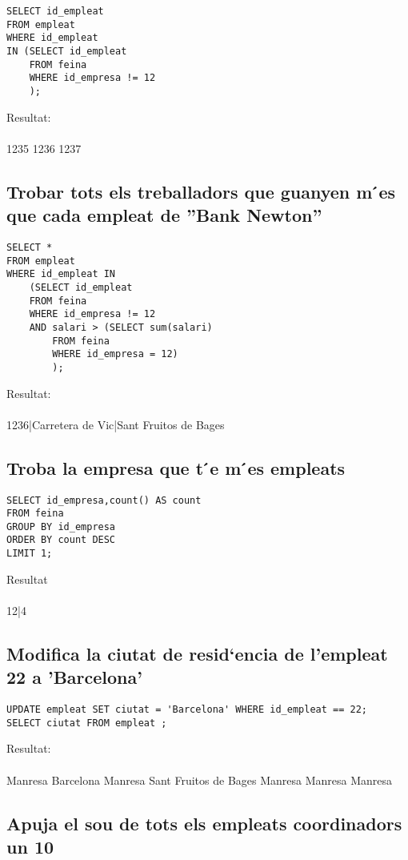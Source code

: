 \documentclass[11p]{article}
\begin{document}
\begin{lstlisting}
SELECT id_empleat 
FROM empleat 
WHERE id_empleat 
IN (SELECT id_empleat 
	FROM feina 
	WHERE id_empresa != 12
	);
\end{lstlisting}
Resultat:\\\\
1235
1236
1237

\subsection{Trobar tots els treballadors que guanyen m ́es que cada empleat de ”Bank Newton”}

\begin{lstlisting}
SELECT * 
FROM empleat 
WHERE id_empleat IN 
	(SELECT id_empleat 
	FROM feina 
	WHERE id_empresa != 12 
	AND salari > (SELECT sum(salari) 
		FROM feina 
		WHERE id_empresa = 12)
		); 
\end{lstlisting}

Resultat: \\\\
1236|Carretera de Vic|Sant Fruitos de Bages

\subsection{Troba la empresa que t ́e m ́es empleats}

\begin{lstlisting}
SELECT id_empresa,count() AS count 
FROM feina 
GROUP BY id_empresa 
ORDER BY count DESC
LIMIT 1;
\end{lstlisting}
Resultat\\\\
12|4

\subsection{Modifica la ciutat de resid`encia de l’empleat 22 a ’Barcelona’}
\begin{lstlisting}
UPDATE empleat SET ciutat = 'Barcelona' WHERE id_empleat == 22;
SELECT ciutat FROM empleat ;
\end{lstlisting}
Resultat:\\\\

Manresa
Barcelona
Manresa
Sant Fruitos de Bages
Manresa
Manresa
Manresa

\subsection{Apuja el sou de tots els empleats coordinadors un 10}
\end{document}
